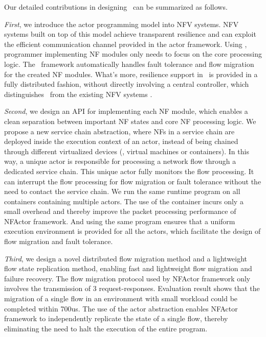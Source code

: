 
Our detailed contributions in designing \nfactor~can be summarized as follows. %



{\em First}, we introduce the actor programming model into
NFV systems. NFV systems built on top of this model achieve transparent resilience and can exploit the efficient communication channel provided in the actor framework. Using \nfactor, programmer implementing NF modules only needs to focus on the core processing logic. The \nfactor~framework
automatically handles fault tolerance and flow migration for the created NF
modules. What's more, resilience support in \nfactor~is provided in a fully distributed fashion, without directly involving a central controller, which distinguishes \nfactor~from the existing NFV systems \cite{gember2015opennf}.

{\em Second}, we design an API for implementing each NF module, which enables a clean separation between important NF states and core NF processing logic. We propose a new service chain abstraction, where NFs in a service chain are deployed inside the execution context of
an actor, instead of being chained through different virtualized devices (\eg, virtual machines or containers). In this way, a unique actor is responsible for processing a network flow through a dedicated service chain. This unique actor fully monitors the flow processing. It can interrupt the flow processing for flow migration or fault tolerance without the need to contact the service chain.  %
We run the same runtime program on all containers containing multiple actors. The use of the container incurs only a small overhead and thereby improve the packet processing performance of NFActor framework. And using the same program ensures that a uniform execution environment is provided for all the actors, which facilitate the design of flow migration and fault tolerance.%

{\em Third}, we design a novel distributed flow migration method and a lightweight
flow state replication method, enabling fast and lightweight flow migration and failure recovery. The flow migration protocol used by NFActor framework only involves the transmission of 3 request-responses. Evaluation result shows that the migration of a single flow in an environment with small workload could be completed within 700us. The use of the actor abstraction enables NFActor framework to independently replicate the state of a single flow, thereby eliminating the need to halt the execution of the entire program. %

